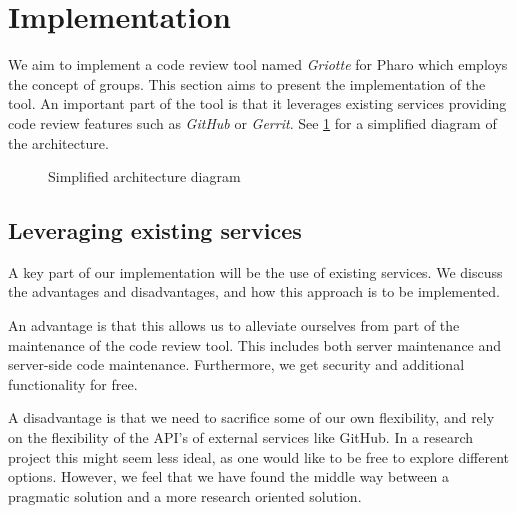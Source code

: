 \documentclass[conference,a4paper]{IEEEtran}
\newcommand{\Gr}{Griotte}
\begin{document}
\section{Implementation}
\label{sec:implementation}
We aim to implement a code review tool named \textit{\Gr} for Pharo
which employs the concept of groups. This section aims to present the
implementation of the tool. An important part of the tool is that it
leverages existing services providing code review features such as
\textit{GitHub} or \textit{Gerrit}. See \cref{fig:diagram} for a
simplified diagram of the architecture.
\begin{figure}[t]
  \caption{Simplified architecture diagram}
  \label{fig:diagram}
\end{figure}

\subsection{Leveraging existing services}
\label{sec:lever-exist-serv}
A key part of our implementation will be the use of existing
services. We discuss the advantages and disadvantages, and how this
approach is to be implemented.

An advantage is that this allows us to alleviate ourselves from part
of the maintenance of the code review tool. This includes both server
maintenance and server-side code maintenance. Furthermore, we get
security and additional functionality for free.

A disadvantage is that we need to sacrifice some of our own
flexibility, and rely on the flexibility of the API's of external
services like GitHub. In a research project this might seem less
ideal, as one would like to be free to explore different
options. However, we feel that we have found the middle way between a
pragmatic solution and a more research oriented solution.
\end{document}
